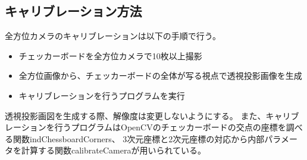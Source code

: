 \documentclass[]{jarticle}          %
\begin{document}
\subsection{キャリブレーション方法}
全方位カメラのキャリブレーションは以下の手順で行う。
\begin{itemize}
  \item チェッカーボードを全方位カメラで10枚以上撮影
  \item 全方位画像から、チェッカーボードの全体が写る視点で透視投影画像を生成
  \item キャリブレーションを行うプログラムを実行
\end{itemize}
透視投影画図を生成する際、解像度は変更しないようにする。
また、キャリブレーションを行うプログラムはOpenCVのチェッカーボードの交点の座標を調べる関数indChessboardCorners、
3次元座標と2次元座標の対応から内部パラメータを計算する関数calibrateCameraが用いられている。
\end{document}
